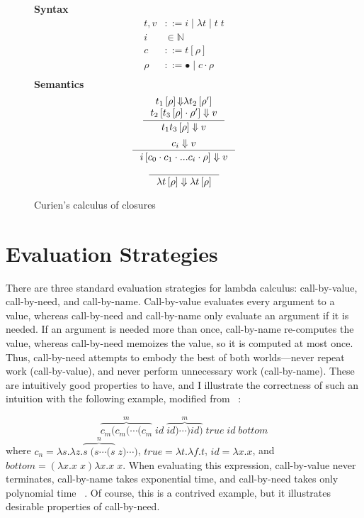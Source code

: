 \begin{figure}
\textbf{Syntax}
\begin{align*}
\tag{Term} t,v &::= i \; | \; \lambda t \; | \; t \; t  \\
\tag{Variable} i &\in \mathbb{N}  \\
\tag{Closure} c &::= t \left[\rho\right] \\
\tag{Environment} \rho &::= \bullet \; | \; c \cdot \rho \\
\end{align*}
\textbf{Semantics}
\begin{align*}
\inference
{t_1\left[\rho\right] {\Downarrow} \lambda t_2\left[\rho'\right] \\ 
 t_2\left[t_3\left[\rho\right] \cdot \rho'\right] \Downarrow v}
{t_1 t_3\left[\rho\right] \Downarrow v } 
\end{align*}
\begin{align*}
\inference
{c_i \Downarrow v}
{i \left[c_0 \cdot c_1 \cdot ... c_i \cdot \rho\right] \Downarrow v}
\end{align*}
\begin{align*}
\inference{}{\lambda t\left[\rho\right] \Downarrow \lambda t\left[\rho\right]}
\end{align*}
\caption{Curien's calculus of closures}
\label{fig:curien}
\end{figure}

\section{Evaluation Strategies} \label{sec:eval_strat}

There are three standard evaluation strategies for lambda calculus:
call-by-value, call-by-need, and call-by-name.  Call-by-value evaluates every argument
to a value, whereas call-by-need and call-by-name only evaluate an argument if
it is needed.  If an argument is needed more than once, call-by-name re-computes
the value, whereas call-by-need memoizes the value, so it is computed at most once.
Thus, call-by-need attempts to embody the best of both worlds---never repeat
work (call-by-value), and never perform unnecessary work (call-by-name). These
are intuitively good properties to have, and I illustrate the
correctness of such an intuition with the following example, modified from
~\cite{danvy2013synthetic}:

$$ \overbrace{c_m (c_m (\cdots(c_m}^{m} \; \mathit{id} \;
\overbrace{\mathit{id})\cdots) \mathit{id})}^{m} \; \mathit{true} \;
\mathit{id} \; \mathit{bottom} $$ where $c_n = \lambda s.\lambda z.\overbrace{s
\; (s \cdots (s}^{n} \; z) \cdots) $, $\mathit{true} = \lambda t.\lambda f.t$,
$\mathit{id}=\lambda x.x$, and \\ $\mathit{bottom} = (\lambda x.x \; x) \lambda x.x \; x$.
When evaluating this expression, call-by-value never terminates, call-by-name
takes exponential time, and call-by-need takes only polynomial time
~\cite{danvy2013synthetic}. Of course, this is a contrived example, but it
illustrates desirable properties of call-by-need.

